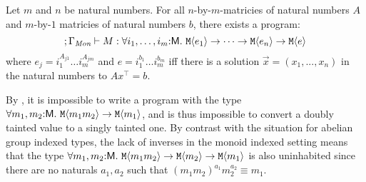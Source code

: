 







\begin{theorem}
  \label{thm:monoid-indefinability}
  Let $m$ and $n$ be natural numbers. For all $n$-by-$m$-matricies of
  natural numbers $A$ and $m$-by-$1$ matricies of natural numbers $b$,
  there exists a program:
  \begin{equation}
    ; \Gamma_{\textit{Mon}} \vdash M : \forall
    i_1,\dots,i_m\mathord:\mathsf{M}.\ \textup{\texttt{M}}\langle e_1 \rangle \to \dots \to
    \textup{\texttt{M}}\langle e_n \rangle \to \textup{\texttt{M}}\langle e \rangle
  \end{equation}
  where $e_j = i_1^{A_{j1}}\dots i_m^{A_{jm}}$ and $e = i_1^{b_1}\dots
  i_m^{b_m}$ iff there is a solution $\vec{x} = (x_1,...,x_n)$ in the
  natural numbers to $A x^\top = b$.
\end{theorem}

\begin{example}
  By , it is impossible to write a
  program with the type $\forall m_1,m_2 \mathord: \mathsf{M}.\
  \textup{\texttt{M}}\langle m_1m_2 \rangle \to \textup{\texttt{M}}\langle m_1 \rangle$, and is thus %
  impossible to convert a doubly tainted value to a singly tainted
  one.
%
  By contrast with the situation for abelian group indexed types, the
  lack of inverses in the monoid indexed setting means that the type
  $\forall m_1,m_2\mathord:\mathsf{M}.\ \tyPrim{M}{m_1m_2} \to
  \tyPrim{M}{m_2} \to \tyPrim{M}{m_1}$ is also uninhabited since there
  are no naturals $a_1,a_2$ such that $(m_1m_2)^{a_1}m_2^{a_2} \equiv
  m_1$.
\end{example}


